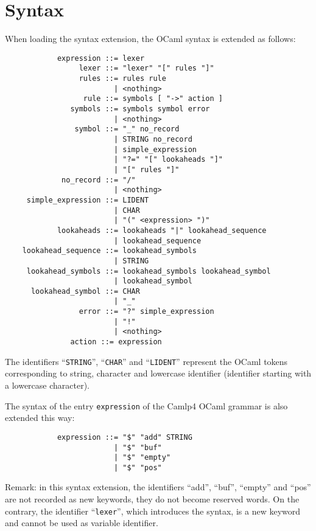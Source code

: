 \documentclass[11pt]{article}
\begin{document}
\section{Syntax}
\label{syntax}

When loading the syntax extension, the OCaml syntax is extended as
follows:

\begin{verbatim}
            expression ::= lexer
                 lexer ::= "lexer" "[" rules "]"
                 rules ::= rules rule
                         | <nothing>
                  rule ::= symbols [ "->" action ]
               symbols ::= symbols symbol error
                         | <nothing>
                symbol ::= "_" no_record
                         | STRING no_record
                         | simple_expression
                         | "?=" "[" lookaheads "]"
                         | "[" rules "]"
             no_record ::= "/"
                         | <nothing>
     simple_expression ::= LIDENT
                         | CHAR
                         | "(" <expression> ")"
            lookaheads ::= lookaheads "|" lookahead_sequence
                         | lookahead_sequence
    lookahead_sequence ::= lookahead_symbols
                         | STRING
     lookahead_symbols ::= lookahead_symbols lookahead_symbol
                         | lookahead_symbol
      lookahead_symbol ::= CHAR
                         | "_"
                 error ::= "?" simple_expression
                         | "!"
                         | <nothing>
               action ::= expression
\end{verbatim}

The identifiers ``\verb/STRING/'', ``\verb/CHAR/'' and
``\verb/LIDENT/'' represent the OCaml tokens corresponding to string,
character and lowercase identifier (identifier starting with a
lowercase character).

The syntax of the entry \verb/expression/ of the Camlp4 OCaml grammar
is also extended this way:

\begin{verbatim}
            expression ::= "$" "add" STRING
                         | "$" "buf"
                         | "$" "empty"
                         | "$" "pos"
\end{verbatim}

Remark: in this syntax extension, the identifiers ``add'', ``buf'',
``empty'' and ``pos'' are not recorded as new keywords, they do not
become reserved words. On the contrary, the identifier
``\verb/lexer/'', which introduces the syntax, is a new keyword and
cannot be used as variable identifier.
\end{document}
